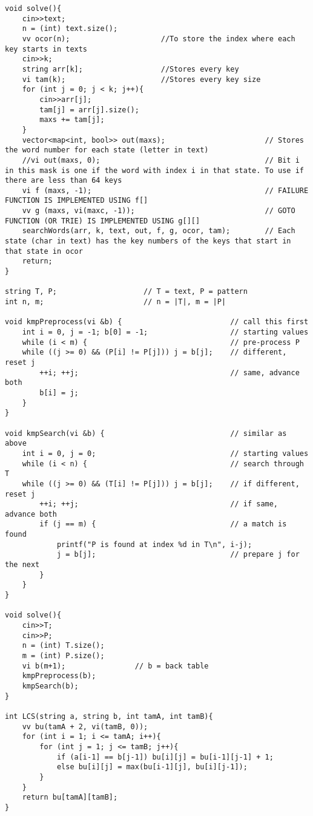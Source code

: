 \documentclass{article}
\begin{document}
\begin{lstlisting}
void solve(){
	cin>>text;
	n = (int) text.size();
	vv ocor(n);                     //To store the index where each key starts in texts
	cin>>k;
	string arr[k];                  //Stores every key
	vi tam(k);                      //Stores every key size
	for (int j = 0; j < k; j++){
		cin>>arr[j];
		tam[j] = arr[j].size();
		maxs += tam[j];
	}
	vector<map<int, bool>> out(maxs);                       // Stores the word number for each state (letter in text)
	//vi out(maxs, 0);                                      // Bit i in this mask is one if the word with index i in that state. To use if there are less than 64 keys
	vi f (maxs, -1);                                        // FAILURE FUNCTION IS IMPLEMENTED USING f[]
	vv g (maxs, vi(maxc, -1));                              // GOTO FUNCTION (OR TRIE) IS IMPLEMENTED USING g[][]
	searchWords(arr, k, text, out, f, g, ocor, tam);        // Each state (char in text) has the key numbers of the keys that start in that state in ocor  
	return;
}

string T, P;                    // T = text, P = pattern
int n, m;                       // n = |T|, m = |P|

void kmpPreprocess(vi &b) {                         // call this first
	int i = 0, j = -1; b[0] = -1;                   // starting values
	while (i < m) {                                 // pre-process P
	while ((j >= 0) && (P[i] != P[j])) j = b[j];    // different, reset j
		++i; ++j;                                   // same, advance both
		b[i] = j;
	}
}

void kmpSearch(vi &b) {                             // similar as above
	int i = 0, j = 0;                               // starting values
	while (i < n) {                                 // search through T
	while ((j >= 0) && (T[i] != P[j])) j = b[j];    // if different, reset j
		++i; ++j;                                   // if same, advance both
		if (j == m) {                               // a match is found
			printf("P is found at index %d in T\n", i-j);
			j = b[j];                               // prepare j for the next
		}
	}
}

void solve(){
	cin>>T;
	cin>>P;
	n = (int) T.size();
	m = (int) P.size();
	vi b(m+1);                // b = back table
	kmpPreprocess(b);
	kmpSearch(b);
}

int LCS(string a, string b, int tamA, int tamB){
	vv bu(tamA + 2, vi(tamB, 0));
	for (int i = 1; i <= tamA; i++){
		for (int j = 1; j <= tamB; j++){
			if (a[i-1] == b[j-1]) bu[i][j] = bu[i-1][j-1] + 1;
			else bu[i][j] = max(bu[i-1][j], bu[i][j-1]);
		}
	}
	return bu[tamA][tamB];
}
\end{lstlisting}

\end{document}
